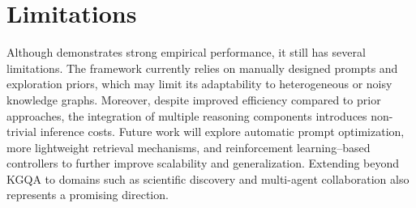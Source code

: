 \section*{Limitations}

Although \method{} demonstrates strong empirical performance, it still has several limitations. The framework currently relies on manually designed prompts and exploration priors, which may limit its adaptability to heterogeneous or noisy knowledge graphs. Moreover, despite improved efficiency compared to prior approaches, the integration of multiple reasoning components introduces non-trivial inference costs. Future work will explore automatic prompt optimization, more lightweight retrieval mechanisms, and reinforcement learning–based controllers to further improve scalability and generalization. Extending \method{} beyond KGQA to domains such as scientific discovery and multi-agent collaboration also represents a promising direction.